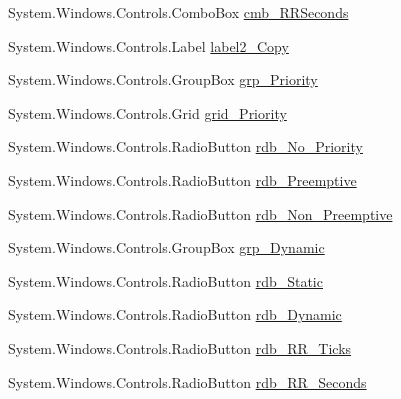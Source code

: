 \begin{DoxyCompactItemize}
\item 
System.\+Windows.\+Controls.\+Combo\+Box \hyperlink{class_c_p_u___o_s___simulator_1_1_operating_system_main_window_ab0c34dd43767c96aefdc333e3fb5b7d1}{cmb\+\_\+\+R\+R\+Seconds}
\item 
System.\+Windows.\+Controls.\+Label \hyperlink{class_c_p_u___o_s___simulator_1_1_operating_system_main_window_abf6d8f5cfb34c8d41580c330c6af3a51}{label2\+\_\+\+Copy}
\item 
System.\+Windows.\+Controls.\+Group\+Box \hyperlink{class_c_p_u___o_s___simulator_1_1_operating_system_main_window_a45f777ff3178acfefdffb311366ab786}{grp\+\_\+\+Priority}
\item 
System.\+Windows.\+Controls.\+Grid \hyperlink{class_c_p_u___o_s___simulator_1_1_operating_system_main_window_a0b2ac61c7430b46fa467986e7afd9448}{grid\+\_\+\+Priority}
\item 
System.\+Windows.\+Controls.\+Radio\+Button \hyperlink{class_c_p_u___o_s___simulator_1_1_operating_system_main_window_acc931be7e054344ea9d99b84ef5c2519}{rdb\+\_\+\+No\+\_\+\+Priority}
\item 
System.\+Windows.\+Controls.\+Radio\+Button \hyperlink{class_c_p_u___o_s___simulator_1_1_operating_system_main_window_a1bdd1425ce8e8dba8ea5906e787aa9b1}{rdb\+\_\+\+Preemptive}
\item 
System.\+Windows.\+Controls.\+Radio\+Button \hyperlink{class_c_p_u___o_s___simulator_1_1_operating_system_main_window_a3021441de903045cba2ff708184e0ac5}{rdb\+\_\+\+Non\+\_\+\+Preemptive}
\item 
System.\+Windows.\+Controls.\+Group\+Box \hyperlink{class_c_p_u___o_s___simulator_1_1_operating_system_main_window_a13fd6e707bf77777692f0fe004a0635b}{grp\+\_\+\+Dynamic}
\item 
System.\+Windows.\+Controls.\+Radio\+Button \hyperlink{class_c_p_u___o_s___simulator_1_1_operating_system_main_window_abb757a3b9a2d8f8c72f54ef2209446b6}{rdb\+\_\+\+Static}
\item 
System.\+Windows.\+Controls.\+Radio\+Button \hyperlink{class_c_p_u___o_s___simulator_1_1_operating_system_main_window_a9d7779e13ed1b78c4387933df4b40d24}{rdb\+\_\+\+Dynamic}
\item 
System.\+Windows.\+Controls.\+Radio\+Button \hyperlink{class_c_p_u___o_s___simulator_1_1_operating_system_main_window_ac47f5adda2930d87ec387e030d2e8870}{rdb\+\_\+\+R\+R\+\_\+\+Ticks}
\item 
System.\+Windows.\+Controls.\+Radio\+Button \hyperlink{class_c_p_u___o_s___simulator_1_1_operating_system_main_window_a97c4b8fbd9b9e86a44dc50b6dafd96f4}{rdb\+\_\+\+R\+R\+\_\+\+Seconds}

\end{DoxyCompactItemize}
